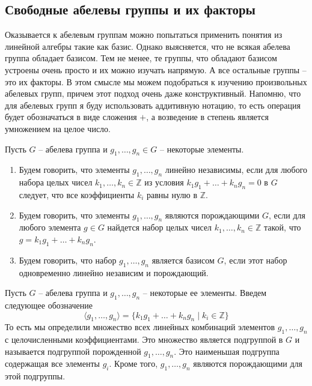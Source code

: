 \subsection{Свободные абелевы группы и их факторы}

Оказывается к абелевым группам можно попытаться применить понятия из линейной алгебры такие как базис.
Однако выясняется, что не всякая абелева группа обладает базисом.
Тем не менее, те группы, что обладают базисом устроены очень просто и их можно изучать напрямую.
А все остальные группы -- это их факторы.
В этом смысле мы можем подобраться к изучению произвольных абелевых групп, причем этот подход очень даже конструктивный.
Напомню, что для абелевых групп я буду использовать аддитивную нотацию, то есть операция будет обозначаться в виде сложения $+$, а возведение в степень является умножением на целое число.

\begin{definition}
\label{def::AbGroupElems}
Пусть $G$ -- абелева группа и $g_1,\ldots, g_n\in G$ -- некоторые элементы.
\begin{enumerate}
\item
\label{def::AbGroupElems::LinIndep}
Будем говорить, что элементы $g_1,\ldots, g_n$ линейно независимы, если для любого набора целых чисел $k_1,\ldots,k_n\in\mathbb Z$ из условия $k_1 g_1+ \ldots + k_n g_n = 0$ в $G$ следует, что все коэффициенты $k_i$ равны нулю в $\mathbb Z$.

\item
\label{def::AbGroupElems::Gen}
Будем говорить, что элементы $g_1,\ldots, g_n$ являются порождающими $G$, если для любого элемента $g\in G$ найдется набор целых чисел $k_1,\ldots, k_n\in \mathbb Z$ такой, что $g = k_1 g_1 +\ldots + k_n g_n$.

\item
\label{def::AbGroupElems::Basis}
Будем говорить, что набор $g_1,\ldots, g_n$ является базисом $G$, если этот набор одновременно линейно независим и порождающий.
\end{enumerate}
\end{definition}

\begin{definition}
\label{def::GenAbGr}
Пусть $G$ -- абелева группа и $g_1,\ldots, g_n$ -- некоторые ее элементы.
Введем следующее обозначение
\[
\langle g_1,\ldots, g_n \rangle = \{ k_1 g_1 + \ldots + k_n g_n \mid k_i \in \mathbb Z \}
\]
То есть мы определили множество всех линейных комбинаций элементов $g_1,\ldots, g_n$ с целочисленными коэффициентами.
Это множество является подгруппой в $G$ и называется подгруппой порожденной $g_1,\ldots, g_n$.
Это наименьшая подгруппа содержащая все элементы $g_i$.
Кроме того, $g_1,\ldots, g_n$ являются порождающими для этой подгруппы.
\end{definition}

